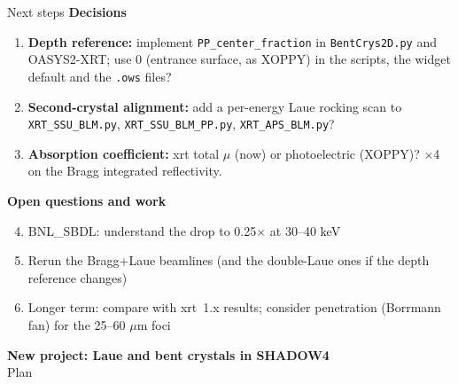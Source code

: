 \documentclass[aspectratio=169,10pt]{beamer}
\begin{document}
\begin{frame}{Next steps}
  \small
  \textbf{Decisions}
  \begin{enumerate}
    \item \textbf{Depth reference:} implement \texttt{PP\_center\_fraction} in
      \texttt{BentCrys2D.py} and OASYS2-XRT; use 0 (entrance surface, as XOPPY) in the
      scripts, the widget default and the \texttt{.ows} files?
    \item \textbf{Second-crystal alignment:} add a per-energy Laue rocking scan to
      \texttt{XRT\_SSU\_BLM.py}, \texttt{XRT\_SSU\_BLM\_PP.py}, \texttt{XRT\_APS\_BLM.py}?
    \item \textbf{Absorption coefficient:} xrt total $\mu$ (now) or photoelectric
      (XOPPY)? $\times$4 on the Bragg integrated reflectivity.
  \end{enumerate}

  \textbf{Open questions and work}
  \begin{enumerate}\setcounter{enumi}{3}
    \item BNL\_SBDL: understand the drop to 0.25$\times$ at 30--40 keV
    \item Rerun the Bragg+Laue beamlines (and the double-Laue ones if the depth reference changes)
    \item Longer term: compare with xrt~1.x results; consider penetration (Borrmann fan)
      for the 25--60 $\mu$m foci
  \end{enumerate}
\end{frame}

\begin{frame}
  \centering
  \Large\textbf{New project: Laue and bent crystals in SHADOW4}\\[1em]
  \normalsize Plan
\end{frame}
\end{document}
